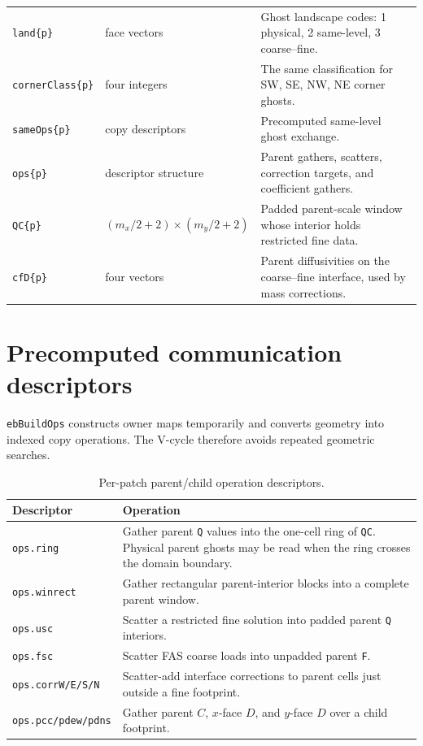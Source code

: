 \documentclass[11pt,oneside,openany]{book}
\newcommand{\code}[1]{\textnormal{\texttt{#1}}}
\begin{document}
\begin{longtable}{@{}p{}p{}p{}@{}}
\code{land\{p\}} & face vectors & Ghost landscape codes: 1 physical, 2 same-level, 3 coarse--fine. \\
\code{cornerClass\{p\}} & four integers & The same classification for SW, SE, NW, NE corner ghosts. \\
\code{sameOps\{p\}} & copy descriptors & Precomputed same-level ghost exchange. \\
\code{ops\{p\}} & descriptor structure & Parent gathers, scatters, correction targets, and coefficient gathers. \\
\code{QC\{p\}} & $(m_x/2+2)\times(m_y/2+2)$ & Padded parent-scale window whose interior holds restricted fine data. \\
\code{cfD\{p\}} & four vectors & Parent diffusivities on the coarse--fine interface, used by mass corrections. \\
\bottomrule
\end{longtable}

\section{Precomputed communication descriptors}
\code{ebBuildOps} constructs owner maps temporarily and converts geometry into indexed copy operations. The V-cycle therefore avoids repeated geometric searches.

\begin{table}[htbp]
\centering
\small
\begin{tabularx}{\textwidth}{@{}p{}X@{}}
\toprule
Descriptor & Operation \\
\midrule
\code{ops.ring} & Gather parent \code{Q} values into the one-cell ring of \code{QC}. Physical parent ghosts may be read when the ring crosses the domain boundary. \\
\code{ops.winrect} & Gather rectangular parent-interior blocks into a complete parent window. \\
\code{ops.usc} & Scatter a restricted fine solution into padded parent \code{Q} interiors. \\
\code{ops.fsc} & Scatter FAS coarse loads into unpadded parent \code{F}. \\
\code{ops.corrW/E/S/N} & Scatter-add interface corrections to parent cells just outside a fine footprint. \\
\code{ops.pcc/pdew/pdns} & Gather parent $C$, $x$-face $D$, and $y$-face $D$ over a child footprint. \\
\bottomrule
\end{tabularx}
\caption{Per-patch parent/child operation descriptors.}
\label{tab:ops}
\end{table}
\end{document}
